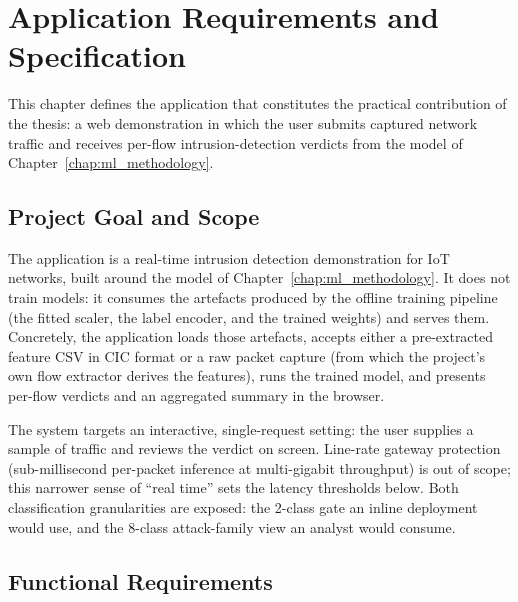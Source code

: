 \chapter{Application Requirements and Specification}
\label{chap:requirements}

\par This chapter defines the application that constitutes the practical contribution of the thesis: a web demonstration in which the user submits captured network traffic and receives per-flow intrusion-detection verdicts from the model of Chapter~\ref{chap:ml_methodology}.

\section{Project Goal and Scope}
\label{sec:project_goal}

\par The application is a real-time intrusion detection demonstration for IoT networks, built around the model of Chapter~\ref{chap:ml_methodology}. It does not train models: it consumes the artefacts produced by the offline training pipeline (the fitted scaler, the label encoder, and the trained weights) and serves them. Concretely, the application loads those artefacts, accepts either a pre-extracted feature CSV in CIC format or a raw packet capture (from which the project's own flow extractor derives the features), runs the trained model, and presents per-flow verdicts and an aggregated summary in the browser.

\par The system targets an interactive, single-request setting: the user supplies a sample of traffic and reviews the verdict on screen. Line-rate gateway protection (sub-millisecond per-packet inference at multi-gigabit throughput) is out of scope; this narrower sense of \enquote{real time} sets the latency thresholds below. Both classification granularities are exposed: the 2-class gate an inline deployment would use, and the 8-class attack-family view an analyst would consume.

\section{Functional Requirements}
\label{sec:functional_requirements}

